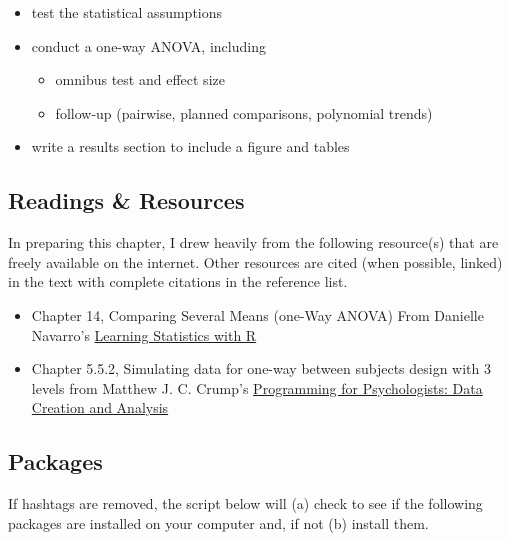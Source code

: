 \documentclass[
  english,
]{book}
\providecommand{\tightlist}{%
  \setlength{\itemsep}{0pt}\setlength{\parskip}{0pt}}
\begin{document}
\begin{itemize}
\tightlist
\item
  test the statistical assumptions
\item
  conduct a one-way ANOVA, including

  \begin{itemize}
  \tightlist
  \item
    omnibus test and effect size
  \item
    follow-up (pairwise, planned comparisons, polynomial trends)
  \end{itemize}
\item
  write a results section to include a figure and tables
\end{itemize}

\hypertarget{readings-resources}{%
\subsection{Readings \& Resources}\label{readings-resources}}

In preparing this chapter, I drew heavily from the following resource(s) that are freely available on the internet. Other resources are cited (when possible, linked) in the text with complete citations in the reference list.

\begin{itemize}
\tightlist
\item
  Chapter 14, Comparing Several Means (one-Way ANOVA) From Danielle Navarro's \href{https://learningstatisticswithr.com/}{Learning Statistics with R}
\item
  Chapter 5.5.2, Simulating data for one-way between subjects design with 3 levels from Matthew J. C. Crump's \href{https://crumplab.github.io/programmingforpsych/simulating-and-analyzing-data-in-r.html\#single-factor-anovas-data-simulation-and-analysis}{Programming for Psychologists: Data Creation and Analysis}
\end{itemize}

\hypertarget{packages-1}{%
\subsection{Packages}\label{packages-1}}

If hashtags are removed, the script below will (a) check to see if the following packages are installed on your computer and, if not (b) install them.
\end{document}
